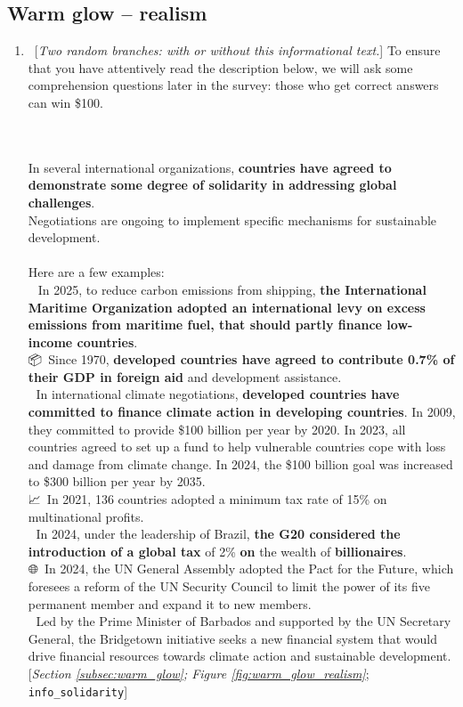  \subsection*{Warm glow -- realism} 
 \begin{enumerate}[resume] 
\item ~[\textit{Two random branches: with or without this informational text.}] \label{q:info_solidarity} To ensure that you have attentively read the description below, we will ask some comprehension questions later in the survey: those who get correct answers can win \$100.

~\\\\In several international organizations, \textbf{countries have agreed to demonstrate some degree of solidarity in addressing global challenges}.\\
Negotiations are ongoing to implement specific mechanisms for sustainable development.\\\\Here are a few examples:\\🚢~In 2025, to reduce carbon emissions from shipping, \textbf{the International Maritime Organization adopted an international levy on excess emissions from maritime fuel, that should partly finance low-income countries}.\\📦~Since 1970, \textbf{developed countries have agreed to contribute 0.7\% of their GDP in foreign aid} and development assistance.\\
🌱 In international climate negotiations, \textbf{developed countries have committed to finance climate action in developing countries}. In 2009, they committed to provide \$100 billion per year by 2020. In 2023, all countries agreed to set up a fund to help vulnerable countries cope with loss and damage from climate change. In 2024, the \$100 billion goal was increased to \$300 billion per year by 2035.\\📈~In 2021, 136 countries adopted a minimum tax rate of 15\% on multinational profits.\\💎 In 2024, under the leadership of Brazil, \textbf{the G20 considered the introduction of a global tax} of 2\% \textbf{on }the wealth of \textbf{billionaires}.
~\\🌐~In 2024, the UN General Assembly adopted the Pact for the Future, which foresees a reform of the UN Security Council to limit the power of its five permanent member and expand it to new members.\\🔄 Led by the Prime Minister of Barbados and supported by the UN Secretary General, the Bridgetown initiative seeks a new financial system that would drive financial resources towards climate action and sustainable development. [\textit{Section \ref{subsec:warm_glow}; Figure \ref{fig:warm_glow_realism}}; 
\verb|info_solidarity|]



\end{enumerate}
